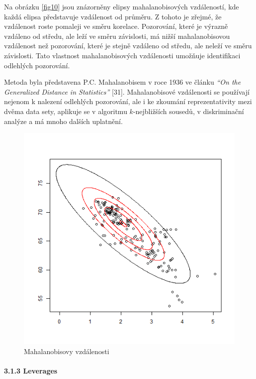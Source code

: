 \documentclass[12pt,]{article}
\let\oldparagraph\paragraph
\renewcommand{\paragraph}[1]{\oldparagraph{#1}\mbox{}}
\begin{document}
\qquad Na obrázku \ref{fig10} jsou znázorněny elipsy mahalanobisových
vzdáleností, kde každá elipsa představuje vzdálenost od průměru. Z
tohoto je zřejmé, že vzdálenost roste pomaleji ve směru korelace.
Pozorování, které je výrazně vzdáleno od středu, ale leží ve směru
závislosti, má nižší mahalanobisovou vzdálenost než pozorování, které je
stejně vzdáleno od středu, ale neleží ve směru závislosti. Tato
vlastnost mahalanobisových vzdálenosti umožňuje identifikaci odlehlých
pozorování.

\qquad Metoda byla představena P.C. Mahalanobisem v roce 1936 ve článku
\emph{\enquote{On the Generalized Distance in Statistics}} {[}31{]}.
Mahalanobisové vzdálenosti se používají nejenom k nalezení odlehlých
pozorování, ale i ke zkoumání reprezentativity mezi dvěma data sety,
aplikuje se v algoritmu \(k\)-nejbližších sousedů, v diskriminační
analýze a má mnoho dalších uplatnění.

\begin{figure}[H]

{\centering \includegraphics[width=0.65\linewidth]{fig/mahalanobis} 

}

\caption{\label{fig10} Mahalanobisovy vzdálenosti}\label{fig:mbdist_img}
\end{figure}

\hypertarget{leverages}{\paragraph{3.1.3 Leverages}\label{leverages}}
\end{document}
